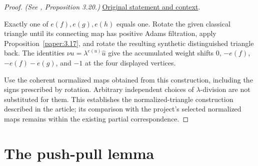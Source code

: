 \begin{proof}
\textit{(See \cite{LWX126}, Proposition 3.20.)} \href{paper/main.tex.html#L965}{Original statement and context}.

Exactly one of $e(f),e(g),e(h)$ equals one. Rotate the given classical triangle until its connecting map has positive Adams filtration, apply Proposition~\ref{paper:3.17}, and rotate the resulting synthetic distinguished triangle back. The identities $\nu u=\lambda^{e(u)}\widehat u$ give the accumulated weight shifts $0$, $-e(f)$, $-e(f)-e(g)$, and $-1$ at the four displayed vertices.

Use the coherent normalized maps obtained from this construction, including the signs prescribed by rotation. Arbitrary independent choices of $\lambda$-division are not substituted for them. This establishes the normalized-triangle construction described in the article; its comparison with the project's selected normalized maps remains within the existing partial correspondence.
\end{proof}

\section{The push-pull lemma}

